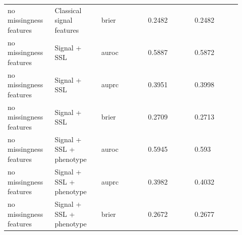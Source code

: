 \documentclass[utf8]{frontiers_suppmat}
\begin{document}
\begin{landscape}
\begin{longtable}{L{0.184\linewidth} L{0.184\linewidth} L{0.184\linewidth} L{0.184\linewidth} L{0.184\linewidth}}
no missingness features & Classical signal features & brier & 0.\allowbreak{}2482 & 0.\allowbreak{}2482 \\
no missingness features & Signal + SSL & auroc & 0.\allowbreak{}5887 & 0.\allowbreak{}5872 \\
no missingness features & Signal + SSL & auprc & 0.\allowbreak{}3951 & 0.\allowbreak{}3998 \\
no missingness features & Signal + SSL & brier & 0.\allowbreak{}2709 & 0.\allowbreak{}2713 \\
no missingness features & Signal + SSL + phenotype & auroc & 0.\allowbreak{}5945 & 0.\allowbreak{}593 \\
no missingness features & Signal + SSL + phenotype & auprc & 0.\allowbreak{}3982 & 0.\allowbreak{}4032 \\
no missingness features & Signal + SSL + phenotype & brier & 0.\allowbreak{}2672 & 0.\allowbreak{}2677 \\
\end{longtable}
\normalsize
\end{landscape}
\end{document}
